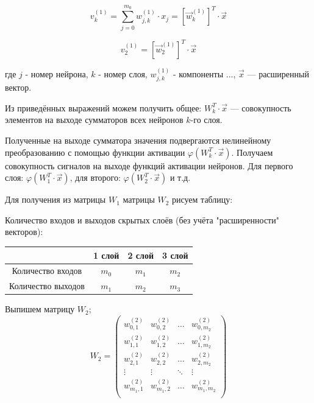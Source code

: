 \documentclass[a4paper]{article}
\numberwithin{equation}{subsection}
\begin{document}

\begin{equation}
    {v}_k^{(1)} = \sum_{j=0}^{m_0} w_{j,k}^{(1)} \cdot x_j = [\vec{w}_{k}^{(1)}]^T \cdot \vec{x}
\end{equation}


\begin{equation*}
    {v}_2^{(1)} = [\vec{w}_{2}^{(1)}]^T \cdot \vec{x}
\end{equation*}

где $j$ - номер нейрона, $k$ - номер слоя, $w_{j,k}^{(1)}$ - компоненты ..., $\vec{x}$ ---
 расширенный вектор.

Из приведённых выражений можем получить общее: $W_k^T \cdot \vec{x}$ --- совокупность элементов 
на выходе сумматоров всех нейронов $k$-го слоя.

Полученные на выходе сумматора значения подвергаются нелинейному преобразованию 
с помощью функции активации $\varphi(W_k^T \cdot \vec{x})$. Получаем совокупность 
сигналов на выходе функций активации нейронов. 
Для первого слоя: $\varphi(W_1^T \cdot \vec{x})$, для второго: $\varphi(W_2^T \cdot \vec{x})$ и т.д.

Для получения из матрицы $W_1$ матрицы $W_2$ рисуем таблицу:

\begin{center}
    Количество входов и выходов скрытых слоёв (без учёта "расширенности" векторов):

    \begin{tabular}{c | c |  c | c |}
        & 1 слой & 2 слой & 3 слой \\
        \hline
        Количество входов  & $m_0$ & $m_1$ & $m_2$ \\
        \hline
        Количество выходов & $m_1$ & $m_2$ & $m_3$ \\
        \hline
    \end{tabular}
\end{center}

Выпишем матрицу $W_2$;
\begin{equation}
    W_2 = 
    \begin{pmatrix}
        w_{0,1}^{(2)} & w_{0,2}^{(2)} & \dots & w_{0,{m_2}}^{(2)} \\
        w_{1,1}^{(2)} & w_{1,2}^{(2)} & \dots & w_{1,{m_2}}^{(2)} \\
        w_{2,1}^{(2)} & w_{2,2}^{(2)} & \dots & w_{2,{m_2}}^{(2)} \\
        \vdots        & \vdots        & \ddots & \vdots           \\
        w_{{m_1},1}^{(2)} & w_{{m_1},2}^{(2)} & \dots & w_{{m_1},{m_2}}^{(2)} \\
    \end{pmatrix}
\end{equation}
\end{document}
